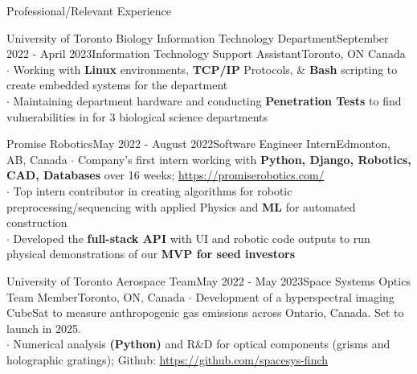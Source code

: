 \documentclass[UTF8]{resume} %
\begin{document}
\begin{rSection}{Professional/Relevant Experience}
\begin{rSubsection}{University of Toronto Biology Information Technology Department}{September 2022 - April 2023}{Information Technology Support Assistant}{Toronto, ON Canada}
    $\cdot$ Working with \textbf{Linux} environments, \textbf{TCP/IP} Protocols, \& \textbf{Bash} scripting to create embedded systems for the department \\
    $\cdot$ Maintaining department hardware and conducting \textbf{Penetration Tests} to find vulnerabilities in for 3 biological science departments
\end{rSubsection}
\begin{rSubsection}{Promise Robotics}{May 2022 - August 2022}{Software Engineer Intern}{Edmonton, AB, Canada}
    $\cdot$ Company's first intern working with \textbf{Python, Django, Robotics, CAD, Databases} over 16 weeks; \href{https://promiserobotics.com/}{https://promiserobotics.com/}\\
    $\cdot$ Top intern contributor in creating algorithms for robotic preprocessing/sequencing with applied Physics and \textbf{ML} for automated construction  \\
    $\cdot$ Developed the \textbf{full-stack API} with UI and robotic code outputs to run physical demonstrations of our \textbf{MVP for seed investors}
\end{rSubsection}
\begin{rSubsection}{University of Toronto Aerospace Team}{May 2022 - May 2023}{Space Systems Optics Team Member}{Toronto, ON, Canada}
    $\cdot$ Development of a hyperspectral imaging CubeSat to measure anthropogenic gas emissions across Ontario, Canada. Set to launch in 2025. \\
    $\cdot$ Numerical analysis \textbf{(Python)} and R\&D for optical components (grisms and holographic gratings); Github: \href{https://github.com/spacesys-finch}{https://github.com/spacesys-finch}\\

\end{rSubsection}
\end{rSection}
\end{document}
